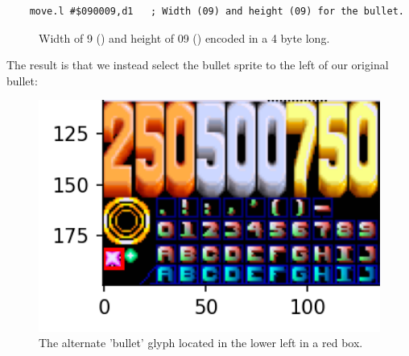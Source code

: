 \begin{lstlisting}
    move.l #$090009,d1   ; Width (09) and height (09) for the bullet.
\end{lstlisting}
\begin{figure}[H]
  {
    \setlength{\tabcolsep}{3.0pt}
    \setlength\cmidrulewidth{\lightrulewidth} %
    \begin{adjustbox}{width=3cm,center}
    \end{adjustbox}
  \caption{Width of 9 () and height of 09 () encoded in a 4 byte long.}
  }
\end{figure}

The result is that we instead select the bullet sprite to the left of our original bullet:
\begin{figure}[H]
    \centering
    \begin{adjustbox}{width=9.5cm,center}
      \includegraphics[width=12cm]{src/bullet/plot2_detail.png}%
    \end{adjustbox}
\caption{The alternate 'bullet' glyph located in the lower left in a red box.}
\end{figure}

